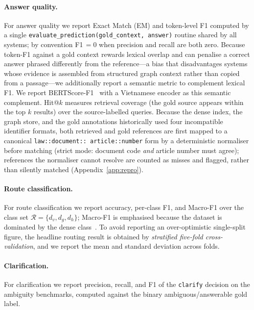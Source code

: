 \paragraph{Answer quality.}
For answer quality we report Exact Match (EM) and token-level F1 computed by a
single \texttt{evaluate\_prediction(gold\_context, answer)} routine shared by
all systems; by convention F1$\,=0$ when precision and recall are both zero.
Because token-F1 against a gold context rewards lexical overlap and can
penalise a correct answer phrased differently from the reference---a bias that
disadvantages systems whose evidence is assembled from structured graph
context rather than copied from a passage---we additionally report a semantic
metric to complement lexical F1.
We report BERTScore-F1~\cite{zhang2020bertscore} with a Vietnamese encoder as
this semantic complement. Hit@$k$ measures retrieval coverage (the gold source
appears within the top $k$ results) over the source-labelled queries. Because
the dense index, the graph store, and the gold annotations historically used
four incompatible identifier formats, both retrieved and gold references are
first mapped to a canonical \texttt{law::\allowbreak document::\allowbreak
article::\allowbreak number} form by a deterministic normaliser before
matching (strict mode: document code \emph{and} article number must agree);
references the normaliser cannot resolve are counted as misses and flagged,
rather than silently matched (Appendix~\ref{app:repro}).

\paragraph{Route classification.}
For route classification we report accuracy, per-class F1, and Macro-F1 over
the class set $\mathcal{R}=\{d_v,d_g,d_h\}$; Macro-F1 is emphasised because the
dataset is dominated by the dense class~\cite{powers2011evaluation}. To avoid
reporting an over-optimistic single-split figure, the headline routing result
is obtained by \emph{stratified five-fold cross-validation}, and we report the
mean and standard deviation across folds.

\paragraph{Clarification.}
For clarification we report precision, recall, and F1 of the \texttt{clarify}
decision on the ambiguity benchmarks, computed against the binary
ambiguous/answerable gold label.

